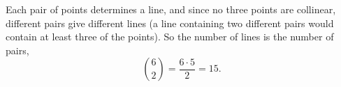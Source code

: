 Each pair of points determines a line, and since no three points are collinear, different pairs give different lines (a line containing two different pairs would contain at least three of the points). So the number of lines is the number of pairs,
\[
\binom62=\dfrac{6\cdot5}{2}=\boxed{15}.
\]
